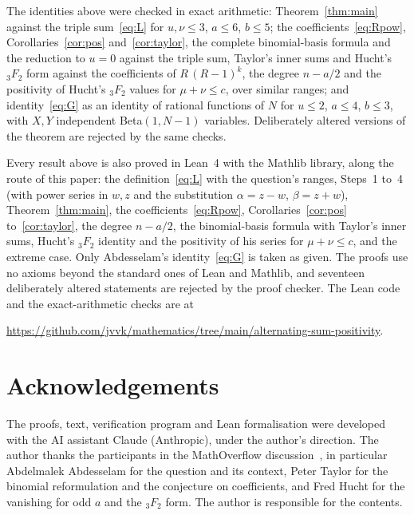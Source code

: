 \documentclass[11pt]{amsart}
\theoremstyle{remark}
\begin{document}
The identities above were checked in exact arithmetic: Theorem~\ref{thm:main} against the triple sum~\eqref{eq:L} for $u,\nu\le3$, $a\le6$, $b\le5$; the coefficients~\eqref{eq:Rpow}, Corollaries~\ref{cor:pos} and~\ref{cor:taylor}, the complete binomial-basis formula and the reduction to $u=0$ against the triple sum, Taylor's inner sums and Hucht's ${}_3F_2$ form against the coefficients of $R\,(R-1)^k$, the degree $n-a/2$ and the positivity of Hucht's ${}_3F_2$ values for $\mu+\nu\le c$, over similar ranges; and identity~\eqref{eq:G} as an identity of rational functions of $N$ for $u\le2$, $a\le4$, $b\le3$, with $X,Y$ independent Beta$(1,N-1)$ variables. Deliberately altered versions of the theorem are rejected by the same checks.

Every result above is also proved in Lean~4 with the Mathlib library, along the route of this paper: the definition~\eqref{eq:L} with the question's ranges, Steps~1 to~4 (with power series in $w,z$ and the substitution $\alpha=z-w$, $\beta=z+w$), Theorem~\ref{thm:main}, the coefficients~\eqref{eq:Rpow}, Corollaries~\ref{cor:pos} to~\ref{cor:taylor}, the degree $n-a/2$, the binomial-basis formula with Taylor's inner sums, Hucht's ${}_3F_2$ identity and the positivity of his series for $\mu+\nu\le c$, and the extreme case. Only Abdesselam's identity~\eqref{eq:G} is taken as given. The proofs use no axioms beyond the standard ones of Lean and Mathlib, and seventeen deliberately altered statements are rejected by the proof checker. The Lean code and the exact-arithmetic checks are at
\begin{center}\small\url{https://github.com/jvvk/mathematics/tree/main/alternating-sum-positivity}.\end{center}

\section*{Acknowledgements}
The proofs, text, verification program and Lean formalisation were developed with the AI assistant Claude (Anthropic), under the author's direction. The author thanks the participants in the MathOverflow discussion~\cite{MO}, in particular Abdelmalek Abdesselam for the question and its context, Peter Taylor for the binomial reformulation and the conjecture on coefficients, and Fred Hucht for the vanishing for odd $a$ and the ${}_3F_2$ form. The author is responsible for the contents.
\end{document}
